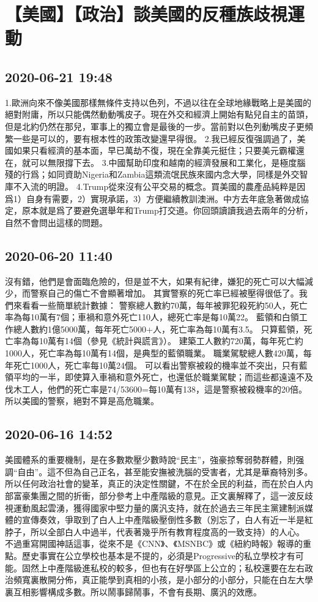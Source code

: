 \documentclass[twocolumn]{ctexart}
\begin{document}
\section*{【美國】【政治】談美國的反種族歧視運動}
\subsection*{2020-06-21 19:48}

1.歐洲向來不像美國那樣無條件支持以色列，不過以往在全球地緣戰略上是美國的絕對附庸，所以只能偶然動動嘴皮子。現在外交和經濟上開始有點兒自主的苗頭，但是北約仍然在那兒，軍事上的獨立會是最後的一步。當前對以色列動嘴皮子更頻繁一些是可以的，要有根本性的政策改變還早得很。
2.我已經反復强調過了，美國如果只看經濟的基本面，早已萬劫不復，現在全靠美元挺住；只要美元霸權還在，就可以無限撐下去。
3.中國幫助印度和越南的經濟發展和工業化，是極度腦殘的行爲；如同資助Nigeria和Zambia這類流氓民族來國内念大學，同樣是外交智庫不入流的明證。
4.Trump從來沒有公平交易的概念。買美國的農產品純粹是因爲1）自身有需要，2）實現承諾，3）方便繼續教訓澳洲。中方去年底急著做成協定，原本就是爲了要避免選舉年和Trump打交道。你回頭讀讀我過去兩年的分析，自然不會問出這樣的問題。
\subsection*{2020-06-20 11:40}

沒有錯，他們是會面臨危險的，但是並不大，如果有紀律，嫌犯的死亡可以大幅減少，而警察自己的傷亡不會顯著增加。
其實警察的死亡率已經被壓得很低了。我們來看看一些簡單統計數據：
警察總人數約70萬，每年被罪犯殺死約50人，死亡率為每10萬有7個；車禍和意外死亡110人，總死亡率是每10萬22。
藍領和白領工作總人數約1億5000萬，每年死亡5000+人，死亡率為每10萬有3.5。
只算藍領，死亡率為每10萬有14個（參見《統計與謊言》）。
建築工人數約720萬，每年死亡約1000人，死亡率為每10萬有14個，是典型的藍領職業。
職業駕駛總人數420萬，每年死亡1000人，死亡率每10萬24個。
可以看出警察被殺的機率並不突出，只有藍領平均的一半，即使算入車禍和意外死亡，也還低於職業駕駛；而這些都遠遠不及伐木工人，他們的死亡率是74/53600=每10萬有138，這是警察被殺機率的20倍。所以美國的警察，絕對不算是高危職業。
\subsection*{2020-06-16 14:52}

美國體系的重要機制，是在多數欺壓少數時說“民主”，強豪掠奪弱勢群體，則强調“自由”。這不但為自己正名，甚至能安撫被洗腦的受害者，尤其是華裔特別多。所以任何政治社會的變革，真正的決定性關鍵，不在於全民的利益，而在於白人内部富豪集團之間的折衝，部分參考上中產階級的意見。正文裏解釋了，這一波反歧視運動風起雲湧，獲得國家中堅力量的廣汎支持，就在於過去三年民主黨建制派媒體的宣傳奏效，爭取到了白人上中產階級壓倒性多數（別忘了，白人有近一半是紅脖子，所以全部白人中過半，代表著幾乎所有教育程度高的一致支持）的人心。
不過重寫開國神話這事，從來不是《CNN》、《MSNBC》或《紐約時報》報導的重點。歷史事實在公立學校也基本是不提的，必須是Progressive的私立學校才有可能。固然上中產階級進私校的較多，但也有在好學區上公立的；私校還要在左右政治頻寬裏散開分佈，真正能學到真相的小孩，是小部分的小部分，只能在白左大學裏互相影響構成多數。所以鬧事歸鬧事，不會有長期、廣汎的效應。
\end{document}
